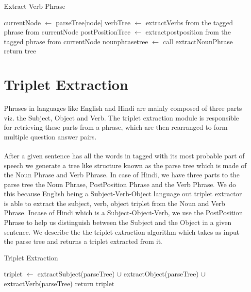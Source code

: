 \begin {algorithm}
\caption {Extract Verb Phrase}
\begin {algorithmic}[1]
\State currentNode $\gets$ parseTree[node]
\State verbTree $\gets$ extractVerbs from the tagged phrase from currentNode
\State postPositionTree $\gets$ extractpostposition from the tagged phrase from currentNode
\State nounphrasetree $\gets$ call extractNounPhrase
\State return tree
\EndProcedure		
\end {algorithmic}
\end {algorithm}

\section{Triplet Extraction}
\paragraph{}
Phrases in languages like English and Hindi are mainly composed of three parts viz. the Subject, Object and Verb. The triplet extraction module is responsible for retrieving these parts from a phrase, which are then rearranged to form multiple question answer pairs.

\paragraph{}
After a given sentence has all the words in tagged with its most probable part of speech we generate a tree like structure known as the parse tree which is made of the Noun Phrase and Verb Phrase. In case of Hindi, we have  three parts to the parse tree the Noun Phrase, PostPosition Phrase and the Verb Phrase. We do this because English being a Subject-Verb-Object language out triplet extractor is able to extract the subject, verb, object triplet from the Noun and Verb Phrase. Incase of Hindi which is a Subject-Object-Verb, we use the PostPosition Phrase to help us distinguish between the Subject and the Object in a given sentence. We describe the the triplet extraction algorithm which takes as input the parse tree and returns a triplet extracted from it.

\begin {algorithm}
\caption {Triplet Extraction}
\begin {algorithmic}[1]
\State triplet $\gets$ extractSubject(parseTree) $\cup$ extractObject(parseTree) $\cup$ extractVerb(parseTree)
\State return triplet
\EndProcedure		
\end {algorithmic}
\end {algorithm}

